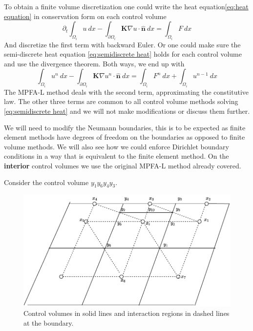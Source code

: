 \documentclass[../Main/main.tex]{subfiles}
\begin{document}
	To obtain a finite volume discretization one could write the heat equation\eqref{eq:heat equation} in conservation form on each control volume
	\begin{equation}
		\partial_t\int_{\Omega_i}u \ dx -\int_{\partial \Omega_i} \pmb{K}\nabla u \cdot \hat{\pmb{n}}\ dx = \int_{\Omega_i} F \ dx
	\end{equation}
	And discretize the first term with backward Euler. Or one could make sure the semi-discrete heat equation \eqref{eq:semidiscrete heat} holds for each control volume and use the divergence theorem. Both ways, we end up with
	\begin{equation}
		\int_{\Omega_i} u^n \ dx - \int_{\partial \Omega_i} \pmb{K}\nabla u^n \cdot \hat{\pmb{n}}\ dx = \int_{\Omega_i} F^n \ dx + \int_{\Omega_i} u^{n-1} \ dx
	\end{equation}
	The MPFA-L method deals with the second term, approximating the constitutive law. The other three terms are common to all control volume methods solving \eqref{eq:semidiscrete heat} and we will not make modifications or discuss them further.
	\par
	We will need to modify the Neumann boundaries, this is to be expected as finite element methods have degrees of freedom on the boundaries as opposed to finite volume methods. We will also see how we could enforce Dirichlet boundary conditions in a way that is equivalent to the finite element method. On the \textbf{interior} control volumes we use the original MPFA-L method already covered.
	\par
	Consider the control volume $y_1 y_6 y_4 y_3$. 
	\begin{figure}[H]
		\centering
		\includegraphics{modified_L_scheme.pdf}
		\caption{Control volumes in solid lines and interaction regions in dashed lines at the boundary.}
	\end{figure}
\end{document}
